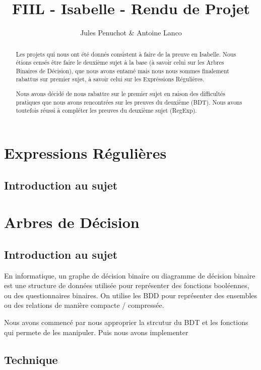 \documentclass{article}
\title{FIIL - Isabelle - Rendu de Projet}
\author{Jules Penuchot \& Antoine Lanco}
\begin{document}
\maketitle

\begin{abstract}

Les projets qui nous ont été donnés consistent à faire de la preuve en Isabelle. Nous étions censés être faire le deuxième sujet à la base (à savoir celui sur les Arbres Binaires de Décision), que nous avons entamé mais nous nous sommes finalement rabattus sur premier sujet, à savoir celui sur les Expréssions Régulières.

Nous avons décidé de nous rabattre sur le premier sujet en raison des difficultés pratiques que nous avons rencontrées sur les preuves du deuxième (BDT). Nous avons toutefois réussi à compléter les preuves du deuxième sujet (RegExp).

\end{abstract}

\section{Expressions Régulières}

\subsection{Introduction au sujet}



\section{Arbres de Décision}

\subsection{Introduction au sujet}

En informatique, un graphe de décision binaire ou diagramme de décision binaire
est une structure de données utilisée pour représenter des fonctions booléennes,
ou des questionnaires binaires. On utilise les BDD pour représenter des
ensembles ou des relations de manière compacte / compressée.

Nous avons commencé par nous approprier la strcutur du BDT et les fonctions qui permete de les manipuler. Puis nous avons implementer 


\subsection{Technique}
\end{document}

